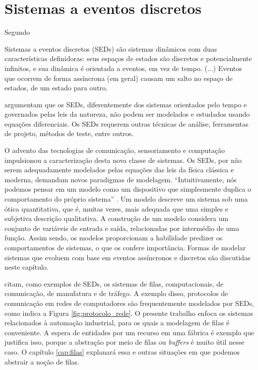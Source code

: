 \chapter{Sistemas a eventos discretos}

Segundo  \begin{citacao} Sistemas a eventos discretos (\acs{SED}s) são sistemas dinâmicos com duas características definidoras: seus espaços de estados são discretos e potencialmente infinitos, e sua dinâmica é orientada a eventos, em vez de tempo. (...) Eventos que ocorrem de forma assíncrona (em geral) causam um salto no espaço de estados, de um estado para outro. \end{citacao}  argumentam que os SEDs, diferentemente dos sistemas orientados pelo tempo e governados pelas leis da natureza, não podem ser modelados e estudados usando equações diferenciais. Os SEDs requerem outras técnicas de análise, ferramentas de projeto, métodos de teste, entre outros.

O advento das tecnologias de comunicação, sensoriamento e computação impulsionou a caracterização desta nova classe de sistemas. Os SEDs, por não serem adequadamente modelados pelas equações das leis da física clássica e moderna, demandam novos paradigmas de modelagem. ``Intuitivamente, nós podemos pensar em um modelo como um dispositivo que simplesmente duplica o comportamento do próprio sistema'' \cite[p. 3, tradução do autor]{cassandras}. Um modelo descreve um sistema sob uma ótica quantitativa, que é, muitas vezes, mais adequada que uma simples e subjetiva descrição qualitativa. A construção de um modelo considera um conjunto de variáveis de entrada e saída, relacionadas por intermédio de uma função. Assim sendo, os modelos proporcionam a habilidade predizer os comportamentos de sistemas, o que os confere importância. Formas de modelar sistemas que evoluem com base em eventos assíncronos e discretos são discutidas neste capítulo.

 citam, como exemplos de SEDs, os sistemas de filas, computacionais, de comunicação, de manufatura e de tráfego. A exemplo disso, protocolos de comunicação em redes de computadores são frequentemente modelados por SEDs, como indica a Figura \ref{fig:protocolo_rede}. O presente trabalho enfoca os sistemas relacionados à automação industrial, para os quais a modelagem de filas é conveniente. A espera de entidades por um recurso em uma fábrica é exemplo que justifica isso, porque a abstração por meio de filas ou \textit{buffers} é muito útil nesse caso. O capítulo \ref{cap:filas} explanará essa e outras situações em que podemos abstrair a noção de filas.

